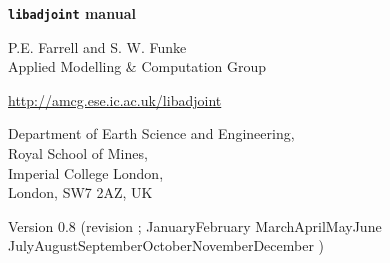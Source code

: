 \documentclass[11pt,a4paper]{book}
\newcommand{\libadjoint}[0]{{\texttt{libadjoint}}\xspace}
\def\today{\number\day\space\ifcase\month\or
 January\or February \or March\or April\or May\or June\or
 July\or August\or September\or October\or November\or December\fi
 \space\number\year}
\begin{document}

\dominitoc[c]

\frontmatter

\begin{titlepage}

\begin{center}

\mbox{}

\vfill

{\bfseries{\huge
\libadjoint manual
\\}}

\vspace{40mm}

{\LARGE
P.E. Farrell and S. W. Funke\\
Applied Modelling \& Computation Group
\\}

\vspace{1mm}


{\LARGE
\url{http://amcg.ese.ic.ac.uk/libadjoint}
}

\vspace{10mm}

{\LARGE
Department of Earth Science and Engineering,\\
Royal School of Mines,\\
Imperial College London,\\
London, SW7 2AZ, UK
\\}

\vspace{80mm}


{\Large
Version 0.8 (revision \hspace{-0.14cm}; \today)
\\}

\vfill

\end{center}

\end{titlepage}



\renewcommand\l@section{\@dottedtocline{1}{1.5em}{2.7em}}
\renewcommand\l@subsection{\@dottedtocline{2}{4.2em}{3.6em}}
\renewcommand\l@subsubsection{\@dottedtocline{3}{7.8em}{4.5em}}
\renewcommand\mtctitle{\hfil\ Contents\hfil}

\makeatother

{ \setlength{\parskip}{0pt} \tableofcontents}
\end{document}
